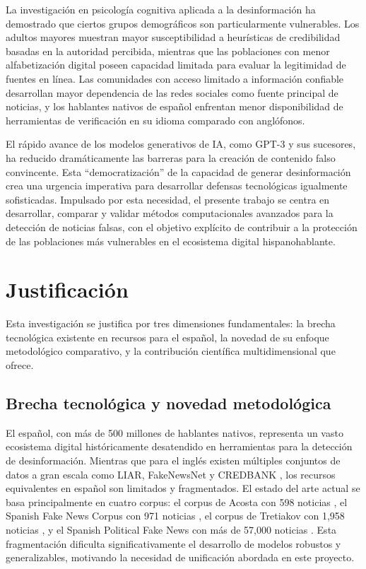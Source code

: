 La investigación en psicología cognitiva aplicada a la desinformación \cite{ali2021fake} ha demostrado que ciertos grupos demográficos son particularmente vulnerables. Los adultos mayores muestran mayor susceptibilidad a heurísticas de credibilidad basadas en la autoridad percibida, mientras que las poblaciones con menor alfabetización digital poseen capacidad limitada para evaluar la legitimidad de fuentes en línea. Las comunidades con acceso limitado a información confiable desarrollan mayor dependencia de las redes sociales como fuente principal de noticias, y los hablantes nativos de español enfrentan menor disponibilidad de herramientas de verificación en su idioma comparado con anglófonos.

El rápido avance de los modelos generativos de IA, como GPT-3 \cite{brown2020language} y sus sucesores, ha reducido dramáticamente las barreras para la creación de contenido falso convincente. Esta ``democratización'' de la capacidad de generar desinformación \cite{su2023fake} crea una urgencia imperativa para desarrollar defensas tecnológicas igualmente sofisticadas. Impulsado por esta necesidad, el presente trabajo se centra en desarrollar, comparar y validar métodos computacionales avanzados para la detección de noticias falsas, con el objetivo explícito de contribuir a la protección de las poblaciones más vulnerables en el ecosistema digital hispanohablante.

\section{Justificación}

Esta investigación se justifica por tres dimensiones fundamentales: la brecha tecnológica existente en recursos para el español, la novedad de su enfoque metodológico comparativo, y la contribución científica multidimensional que ofrece.

\subsection{Brecha tecnológica y novedad metodológica}

El español, con más de 500 millones de hablantes nativos, representa un vasto ecosistema digital históricamente desatendido en herramientas para la detección de desinformación. Mientras que para el inglés existen múltiples conjuntos de datos a gran escala como LIAR, FakeNewsNet y CREDBANK \cite{hu2022deep}, los recursos equivalentes en español son limitados y fragmentados. El estado del arte actual se basa principalmente en cuatro corpus: el corpus de Acosta con 598 noticias \cite{acosta2019construccion}, el Spanish Fake News Corpus con 971 noticias \cite{posadas2019detection}, el corpus de Tretiakov con 1,958 noticias \cite{tretiakov2022detection}, y el Spanish Political Fake News con más de 57,000 noticias \cite{blanco2024enhancing}. Esta fragmentación dificulta significativamente el desarrollo de modelos robustos y generalizables, motivando la necesidad de unificación abordada en este proyecto.

